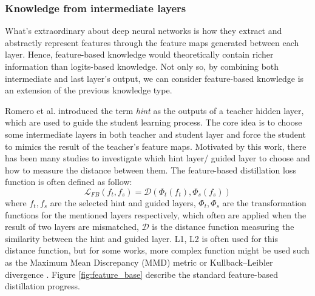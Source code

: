 \subsubsection{Knowledge from intermediate layers}
What's extraordinary about deep neural networks is how they extract and abstractly represent features through the feature maps generated between each layer. Hence, feature-based knowledge would theoretically contain richer information than logits-based knowledge. Not only so, by combining both intermediate and last layer's output, we can consider feature-based knowledge is an extension of the previous knowledge type.

Romero et al. \cite{featurebased01} introduced the term \textit{hint} as the outputs of a teacher hidden layer, which are used to guide the student learning process. The core idea is to choose some intermediate layers in both teacher and student layer and force the student to mimics the result of the teacher's feature maps. Motivated by this work, there has been many studies to investigate which hint layer/ guided layer to choose and how to measure the distance between them. The feature-based distillation loss function is often defined as follow:
\[
   \mathcal{L}_{FB}(f_t, f_s) = \mathcal{D}(\Phi_t(f_t), \Phi_s(f_s))
\]
where $f_t, f_s$ are the selected hint and guided layers, $\Phi_t, \Phi_s$ are the transformation functions for the mentioned layers respectively, which often are applied when the result of two layers are mismatched, $\mathcal{D}$ is the distance function measuring the similarity between the hint and guided layer. L1, L2 is often used for this distance function, but for some works, more complex function might be used such as the Maximum Mean Discrepancy (MMD) metric \cite{featurebased04_mmd} or Kullback–Leibler divergence \cite{featurebased05_kl}. Figure \ref{fig:feature_base} describe the standard feature-based distillation progress.

